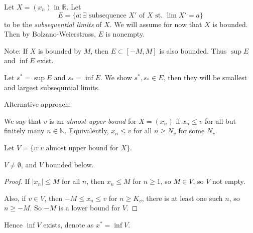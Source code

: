 Let $X = (x_n)$ in $\mathbb{R}$. Let
	\[
		E = \{a: \exists \text{ subsequence }X' \text{ of }X \text{ st. } \lim X' = a\}
	\]
to be the \textit{subsequential limits} of $X$.
We will assume for now that $X$ is bounded. Then by Bolzano-Weierstrass, $E$ is nonempty.

Note: If $X$ is bounded by $M$, then $E \subset [-M, M]$ is also bounded. Thus $\operatorname{sup}  E$ and $\operatorname{inf} E$ exist.

Let $s^* = \operatorname{sup} E$ and $s_* = \operatorname{inf} E$. We show $s^*, s_* \in E$, then they will be smallest and largest subsequntial limits.

Alternative approach:
\begin{definition}
	We say that $v$ is an \textit{almost upper bound} for $X = (x_n)$ if $x_n \le v$ for all but finitely many $n \in \mathbb{N}$. Equivalently, $x_n \le v$ for all $n \ge N_v$ for some $N_v$.
\end{definition}

Let $V = \{v: v \text{ almost upper bound for }X\} $.
\begin{claim}
	$V \neq \emptyset $, and $V$ bounded below.
\end{claim}
\begin{proof}
	If $|x_n| \le M$ for all $n$, then $x_n \le M$ for $n\ge 1$, so $M \in V$, so $V$ not empty.

	Also, if $v  \in V$, then $-M \le x_n \le v$ for $n \ge K_v$, there is at least one such $n$, so $n \ge  -M$. So $-M$ is a lower bound for $V$.
\end{proof}
Hence $\operatorname{inf} V$ exists, denote as $x^* = \operatorname{inf} V$.

